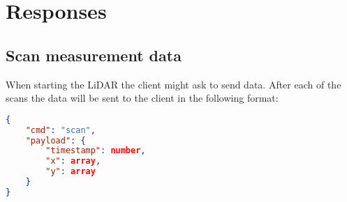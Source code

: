 \documentclass[11pt,a4paper]{article}
\begin{document}
\section{Responses}

\subsection{Scan measurement data}
When starting the LiDAR the client might ask to send data. After each of the scans the data will be sent to the client in the following format:

\vspace{6pt}
\begin{lstlisting}[language=json,firstnumber=1]
{
	"cmd": "scan",
  	"payload": {
  		"timestamp": number,
		"x": array,
		"y": array
  	}
}
\end{lstlisting}
\end{document}
